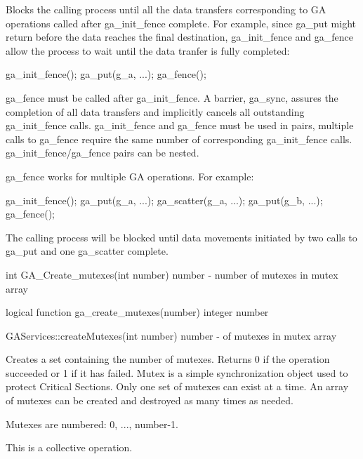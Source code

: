 \documentclass[12pt]{article}
\begin{document}
\begin{desc}

Blocks the calling process until all the data transfers corresponding to GA operations called after ga_init_fence complete. For example, since ga_put might return before the data reaches the final destination, ga_init_fence and ga_fence allow the process to wait until the data tranfer is fully completed:
\begin{codeseg}
        ga_init_fence();
        ga_put(g_a, ...);
        ga_fence();
\end{codeseg}

ga_fence must be called after ga_init_fence. A barrier, ga_sync, assures the completion of all data transfers and implicitly cancels all outstanding ga_init_fence calls. ga_init_fence and ga_fence must be used in pairs, multiple calls to ga_fence require the same number of corresponding ga_init_fence calls. ga_init_fence/ga_fence pairs can be nested.

ga_fence works for multiple GA operations. For example:
\begin{codeseg}
        ga_init_fence();
        ga_put(g_a, ...);
        ga_scatter(g_a, ...);
        ga_put(g_b, ...);
        ga_fence();
\end{codeseg}

The calling process will be blocked until data movements initiated by two calls to ga_put and one ga_scatter complete.
\end{desc}


\begin{capi}
int GA_Create_mutexes(int number)
   number  - number of mutexes in mutex array                             \access{[input]} 
\end{capi}

\begin{fapi}
logical function ga_create_mutexes(number)
   integer number                                                         \access{[input]} 
\end{fapi}

\begin{cxxapi}
GAServices::createMutexes(int number)
   number          - of mutexes in mutex array                            \access{[input]}
\end{cxxapi}

\begin{desc}

Creates a set containing the number of mutexes. Returns 0 if the operation succeeded or 1 if it has failed. Mutex is a simple synchronization object used to protect Critical Sections. Only one set of mutexes can exist at a time. An array of mutexes can be created and destroyed as many times as needed.

Mutexes are numbered: 0, ..., number-1.

This is a collective operation.
\end{desc}
\end{document}
